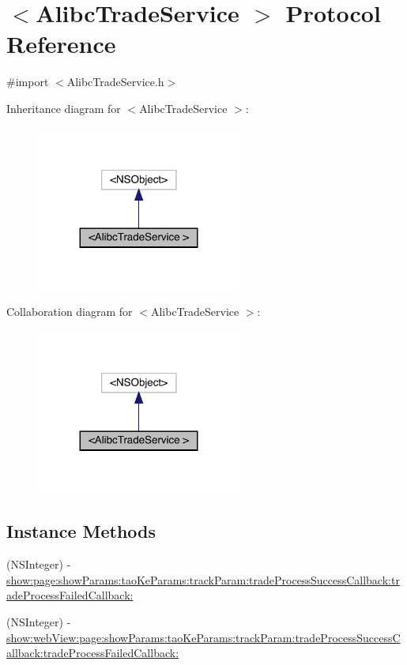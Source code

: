 \hypertarget{protocol_alibc_trade_service_01-p}{}\section{$<$Alibc\+Trade\+Service $>$ Protocol Reference}
\label{protocol_alibc_trade_service_01-p}


{\ttfamily \#import $<$Alibc\+Trade\+Service.\+h$>$}



Inheritance diagram for $<$Alibc\+Trade\+Service $>$\+:\nopagebreak
\begin{figure}[H]
\begin{center}
\leavevmode
\includegraphics[width=191pt]{protocol_alibc_trade_service_01-p__inherit__graph}
\end{center}
\end{figure}


Collaboration diagram for $<$Alibc\+Trade\+Service $>$\+:\nopagebreak
\begin{figure}[H]
\begin{center}
\leavevmode
\includegraphics[width=191pt]{protocol_alibc_trade_service_01-p__coll__graph}
\end{center}
\end{figure}
\subsection*{Instance Methods}
\begin{DoxyCompactItemize}
\item 
(N\+S\+Integer) -\/ \mbox{\hyperlink{protocol_alibc_trade_service_01-p_ad502ae9120c077614429b937784c2a7f}{show\+:page\+:show\+Params\+:tao\+Ke\+Params\+:track\+Param\+:trade\+Process\+Success\+Callback\+:trade\+Process\+Failed\+Callback\+:}}
\item 
(N\+S\+Integer) -\/ \mbox{\hyperlink{protocol_alibc_trade_service_01-p_a0c2dea66b5435d1e9075da7c3e6b252a}{show\+:web\+View\+:page\+:show\+Params\+:tao\+Ke\+Params\+:track\+Param\+:trade\+Process\+Success\+Callback\+:trade\+Process\+Failed\+Callback\+:}}
\end{DoxyCompactItemize}


